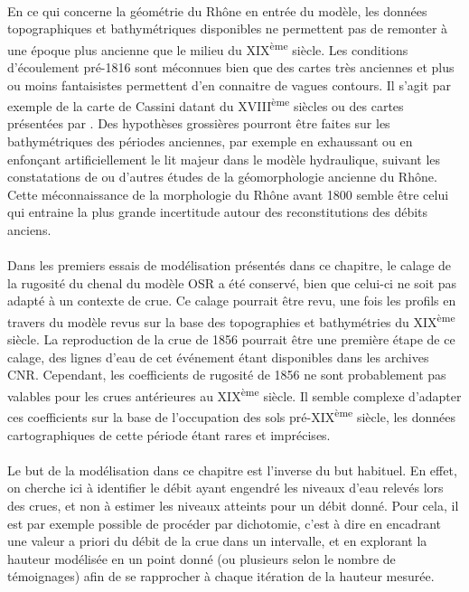 \documentclass[11pt]{article}
\begin{document}
	\paragraph{} En ce qui concerne la géométrie du Rhône en entrée du modèle, les données topographiques et bathymétriques disponibles ne permettent pas de remonter à une époque plus ancienne que le milieu du XIX\textsuperscript{ème} siècle. Les conditions d'écoulement pré-1816 sont méconnues bien que des cartes très anciennes et plus ou moins fantaisistes permettent d'en connaitre de vagues contours. Il s'agit par exemple de la carte de Cassini datant du XVIII\textsuperscript{ème} siècles ou des cartes présentées par \citet{pichard_sept_2014}. Des hypothèses grossières pourront être faites sur les bathymétriques des périodes anciennes, par exemple en exhaussant ou en enfonçant artificiellement le lit majeur dans le modèle hydraulique, suivant les constatations de \citet{pichard_sept_2014} ou d'autres études de la géomorphologie ancienne du Rhône. Cette méconnaissance de la morphologie du Rhône avant 1800 semble être celui qui entraine la plus grande incertitude autour des reconstitutions des débits anciens.
	
	\paragraph{} Dans les premiers essais de modélisation présentés dans ce chapitre, le calage de la rugosité du chenal du modèle OSR a été conservé, bien que celui-ci ne soit pas adapté à un contexte de crue. Ce calage pourrait être revu, une fois les profils en travers du modèle revus sur la base des topographies et bathymétries du XIX\textsuperscript{ème} siècle. La reproduction de la crue de 1856 pourrait être une première étape de ce calage, des lignes d'eau de cet événement étant disponibles dans les archives CNR. Cependant, les coefficients de rugosité de 1856 ne sont probablement pas valables pour les crues antérieures au XIX\textsuperscript{ème} siècle. Il semble complexe d'adapter ces coefficients sur la base de l'occupation des sols pré-XIX\textsuperscript{ème} siècle, les données cartographiques de cette période étant rares et imprécises. 
	
	\paragraph{} Le but de la modélisation dans ce chapitre est l'inverse du but habituel. En effet, on cherche ici à identifier le débit ayant engendré les niveaux d'eau relevés lors des crues, et non à estimer les niveaux atteints pour un débit donné. Pour cela, il est par exemple possible de procéder par dichotomie, c'est à dire en encadrant une valeur a priori du débit de la crue dans un intervalle, et en explorant la hauteur modélisée en un point donné (ou plusieurs selon le nombre de témoignages) afin de se rapprocher à chaque itération de la hauteur mesurée. 
	
\end{document}
